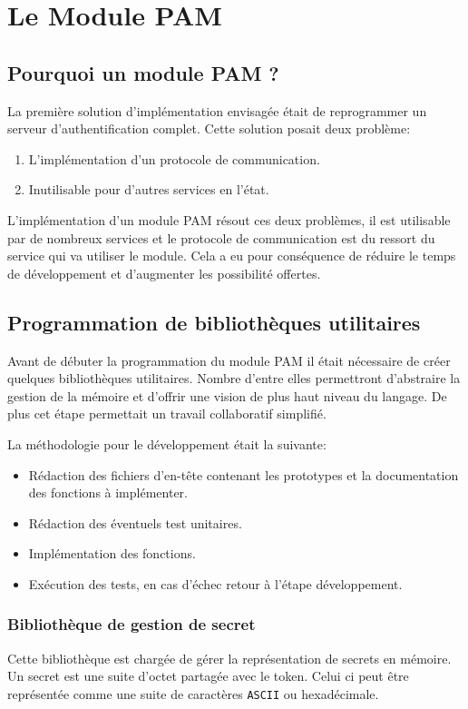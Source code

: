 \newpage
\section{Le Module PAM}
\subsection{Pourquoi un module PAM ?}
La première solution d'implémentation envisagée était de reprogrammer un
serveur d'authentification complet. Cette solution posait deux problème:
\begin{enumerate}
  \item L'implémentation d'un protocole de communication.
  \item Inutilisable pour d'autres services en l'état.
\end{enumerate}

L'implémentation d'un module PAM résout ces deux problèmes, il est utilisable
par de nombreux services et le protocole de communication est du ressort du
service qui va utiliser le module. Cela a eu pour conséquence de réduire le
temps de développement et d'augmenter les possibilité offertes.

\subsection{Programmation de bibliothèques utilitaires}
Avant de débuter la programmation du module PAM il était nécessaire de créer
quelques bibliothèques utilitaires. Nombre d'entre elles permettront
d'abstraire la gestion de la mémoire et d'offrir une vision de plus haut niveau
du langage. De plus cet étape permettait un travail collaboratif simplifié.

La méthodologie pour le développement était la suivante:
\begin{itemize}
  \item Rédaction des fichiers d'en-tête contenant les prototypes et la
  documentation des fonctions à implémenter.
  \item Rédaction des éventuels test unitaires.
  \item Implémentation des fonctions.
  \item Exécution des tests, en cas d'échec retour à l'étape développement.
\end{itemize}

\subsubsection{Bibliothèque de gestion de secret}
Cette bibliothèque est chargée de gérer la représentation de secrets en mémoire.
Un secret est une suite d'octet partagée avec le token. Celui ci peut être
représentée comme une suite de caractères \verb?ASCII? ou hexadécimale.

